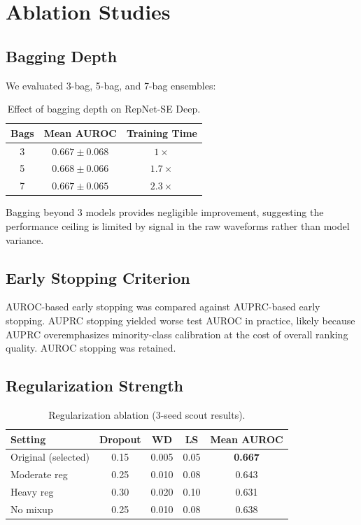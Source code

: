 \documentclass[11pt,a4paper]{article}
\begin{document}
\section{Ablation Studies}
\label{sec:ablation}

\subsection{Bagging Depth}

We evaluated 3-bag, 5-bag, and 7-bag ensembles:

\begin{table}[H]
\centering
\caption{Effect of bagging depth on RepNet-SE Deep.}
\label{tab:bagging}
\begin{tabular}{ccc}
\toprule
\textbf{Bags} & \textbf{Mean AUROC} & \textbf{Training Time} \\
\midrule
3 & $0.667 \pm 0.068$ & $1\times$ \\
5 & $0.668 \pm 0.066$ & $1.7\times$ \\
7 & $0.667 \pm 0.065$ & $2.3\times$ \\
\bottomrule
\end{tabular}
\end{table}

Bagging beyond 3 models provides negligible improvement, suggesting the performance ceiling is limited by signal in the raw waveforms rather than model variance.

\subsection{Early Stopping Criterion}

AUROC-based early stopping was compared against AUPRC-based early stopping. AUPRC stopping yielded worse test AUROC in practice, likely because AUPRC overemphasizes minority-class calibration at the cost of overall ranking quality. AUROC stopping was retained.

\subsection{Regularization Strength}

\begin{table}[H]
\centering
\caption{Regularization ablation (3-seed scout results).}
\label{tab:reg_ablation}
\begin{tabular}{lcccc}
\toprule
\textbf{Setting} & \textbf{Dropout} & \textbf{WD} & \textbf{LS} & \textbf{Mean AUROC} \\
\midrule
Original (selected) & 0.15 & 0.005 & 0.05 & \textbf{0.667} \\
Moderate reg & 0.25 & 0.010 & 0.08 & 0.643 \\
Heavy reg & 0.30 & 0.020 & 0.10 & 0.631 \\
No mixup & 0.25 & 0.010 & 0.08 & 0.638 \\
\bottomrule
\end{tabular}
\end{table}
\end{document}
